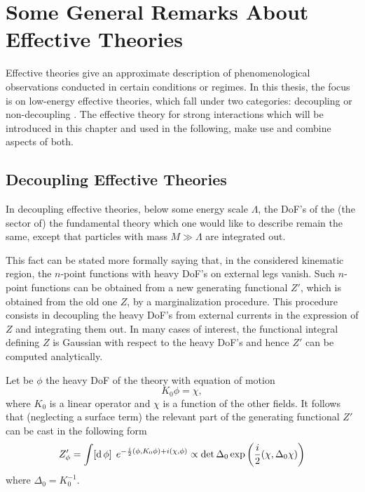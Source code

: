 \section{Some General Remarks About Effective Theories}
\label{sec:et_general_remarks}

Effective theories give an approximate description of phenomenological observations conducted in certain conditions or regimes. In this thesis, the focus is on low-energy effective theories, which fall under two categories: decoupling or non-decoupling \cite{Ecker:2005ny}. The effective theory for strong interactions which will be introduced in this chapter and used in the following, make use and combine aspects of both.

\subsection{Decoupling Effective Theories}

In decoupling effective theories, below some energy scale $\Lambda$, the DoF's of the (the sector of) the fundamental theory which one would like to describe remain the same, except that particles with mass $M \gg \Lambda$ are integrated out. 

This fact can be stated more formally saying that, in the considered kinematic region, the $n$-point functions with heavy DoF's on external legs vanish. Such $n$-point functions can be obtained from a new generating functional $Z'$, which is obtained from the old one $Z$, by a marginalization procedure. This procedure consists in decoupling the heavy DoF's from external currents in the expression of $Z$ and integrating them out. In many cases of interest, the functional integral defining $Z$ is Gaussian with respect to the heavy DoF's and hence $Z'$ can be computed analytically. 

Let be $\phi$ the heavy DoF of the theory with equation of motion
\begin{equation}
  K_0 \phi = \chi ,
  \label{eq:phi_equation_of_motion}
\end{equation}
where $K_0$ is a linear operator and $\chi$ is a function of the other fields. It follows that (neglecting a surface term) the relevant part of the generating functional $Z'$ can be cast in the following form
\begin{equation}
  Z'_\phi = \int \! \left[ \operatorname{d} \phi \right] \; e^{ - \frac{i}{2} \left( \phi , K_0 \phi \right) + i \left( \chi, \phi \right)} \propto \det{\Delta_0} \exp{\left( \frac{i}{2} (\chi, \Delta_0 \chi) \right)}
\end{equation}
where $\Delta_0 = K_0^{-1}$. 


